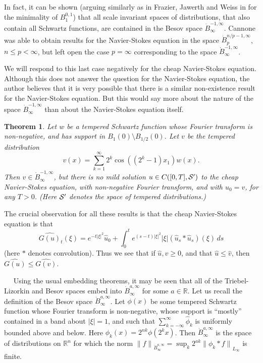 \documentclass[12pt]{article}
\newtheorem{thm}{Theorem}
\newcommand{\R}{{\mathbb R}}
\newcommand{\modo}[1]{{\left|#1\right|}}
\newcommand{\snormo}[1]{{\mathopen\|#1\mathclose\|}}
\newcommand{\Proofof}[1]{\medskip\noindent{\bf Proof of #1:}\ \ }
\begin{document}
In fact, it can be shown (arguing similarly as in Frazier, Jawerth and Weiss 
in \cite{FJW} for the minimality of $B^{0,1}_1$)
that all scale invariant spaces of distributions,
that also contain all Schwartz functions, are
contained in the Besov space $\dot B^{-1,\infty}_\infty$.
Cannone \cite{Ca1} was able to obtain results for the Navier-Stokes
equation in the space $\dot B^{n/p-1,\infty}_p$, 
$n\leq p<\infty$, but left open the case $p=\infty$ corresponding
to the space $\dot B^{-1,\infty}_\infty$.

We will respond to this last case negatively for
the cheap Navier-Stokes equation.  Although this does not answer
the question for the Navier-Stokes equation, the author believes that
it is very possible that there is a similar non-existence result
for the Navier-Stokes equation.  But this would say more about the
nature of the space $\dot B^{-1,\infty}_\infty$ than about the 
Navier-Stokes equation itself.

\begin{thm}
\label{no-exist}
Let $w$ be a tempered Schwartz function whose Fourier transform
is non-negative, and has support in 
$B_{1}(0) \setminus B_{1/2}(0)$.
Let $v$ be the tempered distribution
\[ 
v(x) = \sum_{k=1}^\infty 2^k \cos((2^k-1) x_1) w(x) .
\]
Then $v \in \dot B^{-1,\infty}_\infty$, but there is
no mild solution $u\in C([0,T],{\cal S}')$ to the cheap 
Navier-Stokes equation, with non-negative
Fourier transform, and with $u_0=v$, for any $T>0$. (Here
${\cal S}'$ denotes the space of tempered distributions.)
\end{thm}

\noindent
The crucial observation for all these results is that the cheap Navier-Stokes
equation is that
\begin{equation*}
\widehat{G(u)}_t(\xi) = 
e^{-t\modo{\xi}^2} \hat u_0 
+ \int_0^t e^{(s-t)\modo{\xi}^2} \modo{\xi} (\hat u_s*\hat u_s)(\xi) \, ds
\end{equation*}
(here $*$ denotes convolution).  Thus we see that if $\hat u, \hat v \ge 0$,
and that $\hat u \le \hat v$, then $\widehat{G(u)} \le \widehat{G(v)}$.

\Proofof{Theorem~\ref{blow-up}}
Using the usual embedding theorems, it may be seen that all of the
Triebel-Lizorkin and Besov spaces
embed into $\dot B_\infty^{a,\infty}$ for some $a \in \R$.
Let us recall the definition of the Besov space $\dot B_\infty^{a,\infty}$.
Let $\phi(x)$ be some 
tempered Schwartz function
whose Fourier transform is non-negative, 
whose support is ``mostly'' contained
in a band about $\modo\xi=1$, and such that
$\sum_{k=-\infty}^\infty \hat \phi_k$ is uniformly bounded above and below.
Here $\phi_k(x) = 2^{nk} \phi(2^k x)$.
Then $\dot B_\infty^{a,\infty}$ is the space of 
distributions on $\R^n$ for
which the norm
$
\snormo f_{\dot B_\infty^{a,\infty}} 
= \sup_k 2^{a k} \snormo{\phi_k* f}_{L_\infty} 
$
is finite.
\end{document}
